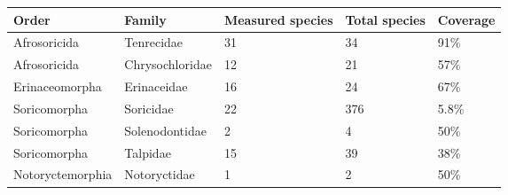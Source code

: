 

\begin{tabular}{p{3.3cm}p{3.3cm}p{2cm}p{2cm}p{2cm}}

\hline
\textbf{Order} & \textbf{Family} & \textbf{Measured species} & \textbf{Total species} & \textbf{Coverage} \\
\hline
Afrosoricida & Tenrecidae & 31 & 34 & 91\% \\
Afrosoricida & Chrysochloridae & 12 & 21 & 57\% \\
Erinaceomorpha & Erinaceidae & 16 & 24 & 67\% \\
Soricomorpha & Soricidae & 22 & 376 & 5.8\% \\
Soricomorpha & Solenodontidae & 2 & 4 & 50\% \\
Soricomorpha & Talpidae & 15 & 39 & 38\% \\
Notoryctemorphia & Notoryctidae & 1 & 2 & 50\% \\
\hline

\end{tabular}

